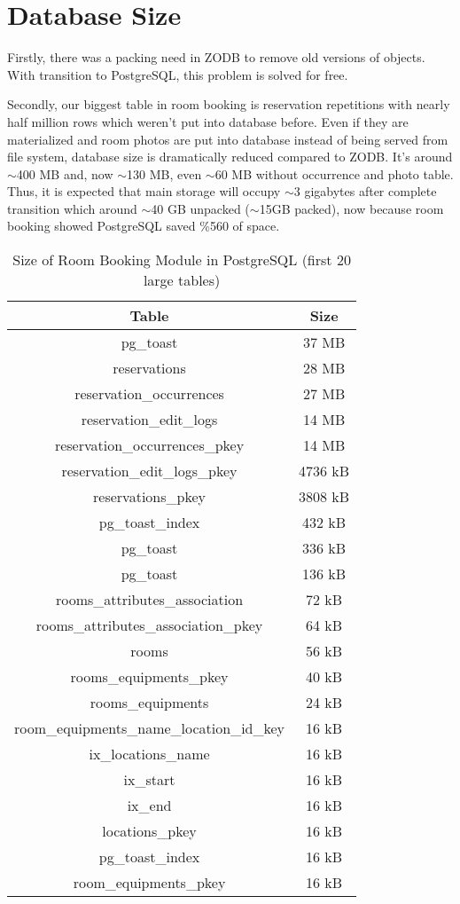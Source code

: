 \section{Database Size}

Firstly, there was a packing need in ZODB to remove old versions of objects. With transition to PostgreSQL, this problem is solved for free.

Secondly, our biggest table in room booking is reservation repetitions with nearly half million rows which weren't put into database before. Even if they are materialized and room photos are put into database instead of being served from file system, database size is dramatically reduced compared to ZODB. It's around $\sim$400 MB and, now $\sim$130 MB, even $\sim$60 MB without occurrence and photo table. Thus, it is expected that main storage will occupy $\sim$3 gigabytes after complete transition which around $\sim$40 GB unpacked ($\sim$15GB packed), now because room booking showed PostgreSQL saved \%560 of space.

\begin{table}[t]
	\centering
    \begin{tabular}{ | c | c |}
    \hline
    \textbf{Table} & \textbf{Size} \\ \hline
	 pg\_toast & 37 MB \\ \hline
     reservations & 28 MB \\ \hline
     reservation\_occurrences & 27 MB \\ \hline
     reservation\_edit\_logs & 14 MB \\ \hline
     reservation\_occurrences\_pkey & 14 MB \\ \hline
     reservation\_edit\_logs\_pkey & 4736 kB \\ \hline
     reservations\_pkey & 3808 kB \\ \hline
     pg\_toast\_index & 432 kB \\ \hline
     pg\_toast & 336 kB \\ \hline
     pg\_toast & 136 kB \\ \hline
     rooms\_attributes\_association & 72 kB \\ \hline
     rooms\_attributes\_association\_pkey & 64 kB \\ \hline
     rooms & 56 kB \\ \hline
     rooms\_equipments\_pkey & 40 kB \\ \hline
     rooms\_equipments & 24 kB \\ \hline
     room\_equipments\_name\_location\_id\_key & 16 kB \\ \hline
     ix\_locations\_name & 16 kB \\ \hline
     ix\_start & 16 kB \\ \hline
     ix\_end & 16 kB \\ \hline
     locations\_pkey & 16 kB \\ \hline
     pg\_toast\_index & 16 kB \\ \hline
     room\_equipments\_pkey & 16 kB \\ \hline
    \end{tabular} 
    \caption{Size of Room Booking Module in PostgreSQL (first 20 large tables)}
    \label{limitations}
\end{table}

